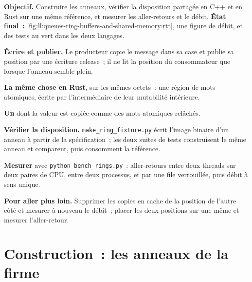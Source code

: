 \begin{tutorial}
\textbf{Objectif.} Construire les anneaux, vérifier la disposition partagée en C++ et en Rust sur une même référence, et mesurer les aller-retours
et le débit. \textbf{État final~:} \cref{fig:ll:queues-ring-buffers-and-shared-memory:rtt}, une figure de débit, et des tests au vert
dans les deux langages.
\begin{tutsteps}
\item \textbf{Écrire et publier.} Le producteur copie le message dans sa case et publie sa position par une écriture release~;
il ne lit la position du consommateur que lorsque l'anneau semble plein.
\label{lst:ll:queues-ring-buffers-and-shared-memory:spsc}
\item \textbf{La même chose en Rust}, sur les mêmes octets~: une région de mots atomiques, écrite par l'intermédiaire de leur mutabilité intérieure.
\label{lst:ll:queues-ring-buffers-and-shared-memory:rust}
\item \textbf{Un } dont la valeur est copiée comme des mots atomiques relâchés.
\label{lst:ll:queues-ring-buffers-and-shared-memory:seqlock}
\item \textbf{Vérifier la disposition.} \texttt{make\_ring\_fixture.py} écrit l'image binaire d'un anneau à partir de la spécification~; les deux
suites de tests construisent le même anneau et comparent, puis consomment la référence.
\item \textbf{Mesurer} avec \texttt{python bench\_rings.py}~: aller-retours entre deux threads sur deux paires de CPU, entre deux
processus, et par une file verrouillée, puis débit à sens unique.
\end{tutsteps}
\textbf{Pour aller plus loin.} Supprimer les copies en cache de la position de l'autre côté et mesurer à nouveau le débit~; placer les deux positions sur
une même  et mesurer l'aller-retour.
\end{tutorial}

\section{Construction~: les anneaux de la firme}\label{bld:ll:queues-ring-buffers-and-shared-memory:ring}

